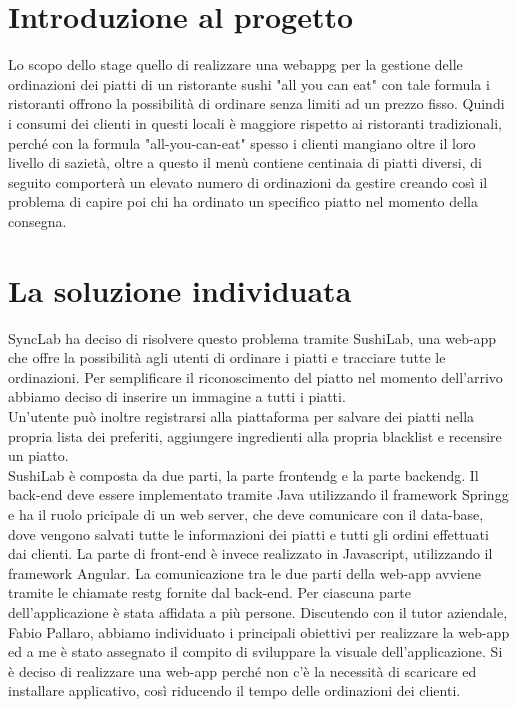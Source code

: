 \section{Introduzione al progetto}
Lo scopo dello stage quello di realizzare una \gls{webappg} per la gestione delle ordinazioni dei piatti di un ristorante sushi "all you can eat" con tale formula i ristoranti offrono la possibilità di ordinare senza limiti ad un prezzo fisso. Quindi i consumi dei clienti in questi locali è maggiore rispetto ai ristoranti tradizionali, perché con la formula "all-you-can-eat" spesso i clienti mangiano oltre il loro livello di sazietà, oltre a questo il menù contiene centinaia di piatti diversi, di seguito comporterà un elevato numero di ordinazioni da gestire creando così il problema di capire poi chi ha ordinato un specifico piatto nel momento della consegna.

\section{La soluzione individuata}
SyncLab ha deciso di risolvere questo problema tramite SushiLab, una web-app che offre la possibilità agli utenti di ordinare i piatti e tracciare tutte le ordinazioni. Per semplificare il riconoscimento del piatto nel momento dell'arrivo abbiamo deciso di inserire un immagine a tutti i piatti.\\ 
Un'utente può inoltre registrarsi alla piattaforma per salvare dei piatti nella propria lista dei preferiti, aggiungere ingredienti alla propria blacklist e recensire un piatto.\\
SushiLab è composta da due parti, la parte \gls{frontendg} e la parte \gls{backendg}. Il back-end deve essere implementato tramite Java utilizzando il framework \gls{Springg} e ha il ruolo pricipale di un web server, che deve comunicare con il data-base, dove vengono salvati tutte le informazioni dei piatti e tutti gli ordini effettuati dai clienti.
La parte di front-end è invece realizzato in Javascript, utilizzando il framework Angular. La comunicazione tra le due parti della web-app avviene tramite le chiamate \gls{restg} fornite dal back-end.
Per ciascuna parte dell'applicazione è stata affidata a più persone. Discutendo con il tutor aziendale, Fabio Pallaro, abbiamo individuato i principali obiettivi per realizzare la web-app ed a me è stato assegnato il compito di sviluppare la visuale dell'applicazione. 
Si è deciso di realizzare una web-app perché non c'è la necessità di scaricare ed installare applicativo, così riducendo il tempo delle ordinazioni dei clienti.

